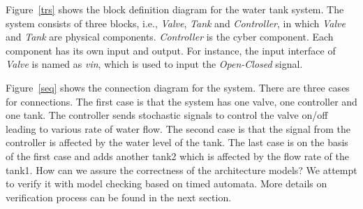 Figure~\ref{trs} shows the block definition diagram for the water tank system. The system consists of three blocks, i.e., \emph{Valve}, \emph{Tank} and \emph{Controller}, in which \emph{Valve} and \emph{Tank} are physical components. \emph{Controller} is the cyber component. Each component has its own input and output. For instance, the input interface of \emph{Valve} is named as \emph{vin}, which is used to input the \emph{Open-Closed} signal. 

Figure~\ref{seq} shows the connection diagram for the system. There are three cases for connections. The first case is that the system has one valve, one controller and one tank. The controller sends stochastic signals to control the valve on/off leading to various rate of water flow. The second case is that the signal from the controller is affected by the water level of the tank. The last case is on the basis of the first case and adds another tank2 which is affected by the flow rate of the tank1. How can we assure the correctness of the architecture models? We attempt to verify it with model checking based on timed automata. More details on verification process can be found in the next section.
